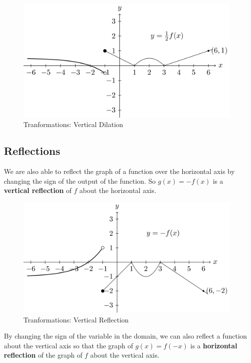 \documentclass[
]{book}
\theoremstyle{definition}
\theoremstyle{definition}
\theoremstyle{definition}
\theoremstyle{definition}
\theoremstyle{remark}
\begin{document}
\begin{figure}

{\centering \includegraphics[width=0.8\linewidth]{tikz/vertical-dilation} 

}

\caption{Tranformations: Vertical Dilation}\label{fig:vertical-dilation}
\end{figure}

\hypertarget{reflections}{%
\subsection{Reflections}\label{reflections}}

We are also able to reflect the graph of a function over the horizontal axis by changing the sign of the output of the function. So \(g(x)=-f(x)\) is a \textbf{vertical reflection} of \(f\) about the horizontal axis.

\begin{figure}

{\centering \includegraphics[width=0.8\linewidth]{tikz/vertical-reflection} 

}

\caption{Tranformations: Vertical Reflection}\label{fig:vertical-reflection}
\end{figure}

By changing the sign of the variable in the domain, we can also reflect a function about the vertical axis so that the graph of \(g(x)=f(-x)\) is a \textbf{horizontal reflection} of the graph of \(f\) about the vertical axis.
\end{document}
